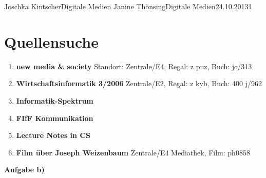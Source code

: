 \documentclass{wa}
\begin{document}
	{Joschka Kintscher}{Digitale Medien}
	{Janine Thönsing}{Digitale Medien}{24.10.2013}{1}


\section{Quellensuche}

  \begin{enumerate}
    \item\textbf{new media \& society}
    \newline
    Standort: Zentrale/E4, Regal: z puz, Buch: jc/313
    \newline
    \cite{vergeer2013}

    \item\textbf{Wirtschaftsinformatik 3/2006}
    \newline
    Zentrale/E2, Regal: z kyb, Buch: 400 j/962
    \newline
    \cite{thiesse2006}

    \item\textbf{Informatik-Spektrum}
    \newline
    \cite{lintu2009}

    \item\textbf{FIfF Kommunikation}
    \newline
    \cite{bockerman2013}

  \item\textbf{Lecture Notes in CS}
  \newline
  \cite{temdee2006}
 
  \item\textbf{Film über Joseph Weizenbaum}
  \newline
  Zentrale/E4 Mediathek, Film: ph0858
  \newline
  \cite{haas2006}
  \newline
\end{enumerate}

\begin{LARGE}
  \textbf{Aufgabe b)}
\end{LARGE}



\end{document}
